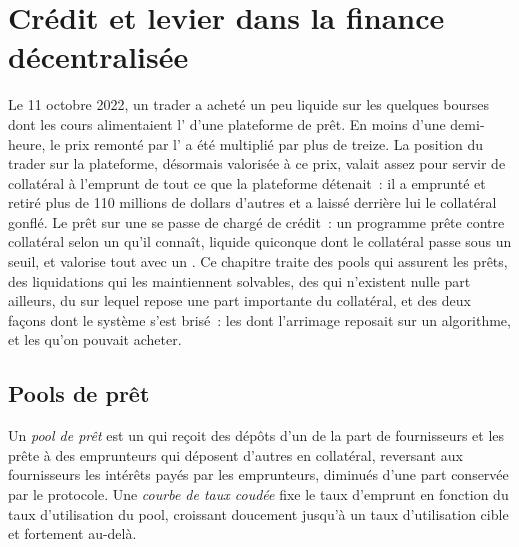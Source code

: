 \chapter{Crédit et levier dans la finance décentralisée}\label{ch:m3:defi-credit-and-leverage}

Le 11 octobre 2022, un trader a acheté un  peu liquide sur les quelques bourses dont les cours alimentaient l' d'une plateforme de prêt.
En moins d'une demi-heure, le prix remonté par l' a été multiplié par plus de treize. La position du trader sur
la plateforme, désormais valorisée à ce prix, valait assez pour servir de collatéral à l'emprunt de tout ce que la plateforme
détenait~: il a emprunté et retiré plus de 110 millions de dollars d'autres  et a laissé
derrière lui le collatéral gonflé. Le prêt sur une  se passe de chargé de crédit~: un programme prête contre collatéral
selon un  qu'il connaît, liquide quiconque dont le collatéral passe sous un seuil, et valorise tout
avec un . Ce chapitre traite des pools qui assurent les prêts, des liquidations qui les maintiennent solvables, des
 qui n'existent nulle part ailleurs, du  sur lequel repose une part importante du collatéral, et des
deux façons dont le système s'est brisé~: les  dont l'arrimage reposait sur un algorithme, et les 
qu'on pouvait acheter.

\section{Pools de prêt}

\begin{definition}\label{def:m3:defi-credit-and-leverage:pool}
Un \emph{pool de prêt} est un  qui reçoit des dépôts d'un  de la part de fournisseurs et
les prête à des emprunteurs qui déposent d'autres  en collatéral, reversant aux fournisseurs les intérêts payés par les emprunteurs, diminués
d'une part conservée par le protocole. Une \emph{courbe de taux coudée} fixe le taux d'emprunt
en fonction du taux d'utilisation du pool, croissant doucement jusqu'à un taux d'utilisation cible et fortement au-delà.
\end{definition}

